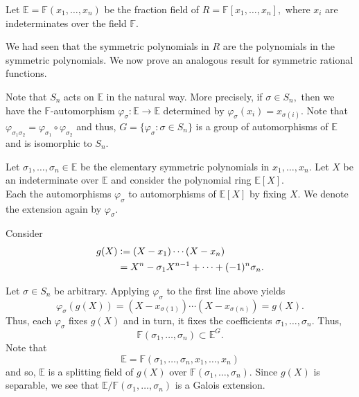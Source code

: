 \begin{ex}
    Let $\mathbb{E} = \mathbb{F}(x_1, \ldots, x_n)$ be the fraction field of $R = \mathbb{F}[x_1, \ldots, x_n],$ where $x_i$ are indeterminates over the field $\mathbb{F}.$

    We had seen that the symmetric polynomials in $R$ are the polynomials in the symmetric polynomials. We now prove an analogous result for symmetric rational functions. 

    Note that $S_n$ acts on $\mathbb{E}$ in the natural way. More precisely, if $\sigma \in S_n,$ then we have the $\mathbb{F}$-automorphism $\varphi_\sigma : \mathbb{E} \to \mathbb{E}$ determined by $\varphi_\sigma(x_i) = x_{\sigma(i)}.$ Note that $\varphi_{\sigma_1\sigma_2} = \varphi_{\sigma_1} \circ \varphi_{\sigma_2}$ and thus, $G = \{\varphi_\sigma : \sigma \in S_n\}$ is a group of automorphisms of $\mathbb{E}$ and is isomorphic to $S_n.$

    Let $\sigma_1, \ldots, \sigma_n \in \mathbb{E}$ be the elementary symmetric polynomials in $x_1, \ldots, x_n.$ Let $X$ be an indeterminate over $\mathbb{E}$ and consider the polynomial ring $\mathbb{E}[X].$ \\
    Each the automorphisms $\varphi_\sigma$ to automorphisms of $\mathbb{E}[X]$ by fixing $X.$ We denote the extension again by $\varphi_\sigma.$

    Consider
    \begin{align*} 
        g(X) &\vcentcolon= (X - x_1) \cdots (X - x_n)\\
        &= X^n - \sigma_1 X^{n - 1} + \cdots + (-1)^n\sigma_n.
    \end{align*}

    Let $\sigma \in S_n$ be arbitrary. Applying $\varphi_\sigma$ to the first line above yields
    \begin{equation*} 
        \varphi_\sigma(g(X)) = (X - x_{\sigma(1)}) \cdots (X - x_{\sigma(n)}) = g(X).
    \end{equation*}
    Thus, each $\varphi_\sigma$ fixes $g(X)$ and in turn, it fixes the coefficients $\sigma_1, \ldots, \sigma_n.$ Thus,
    \begin{equation*} 
        \mathbb{F}(\sigma_1, \ldots, \sigma_n) \subset \mathbb{E}^G.
    \end{equation*}
    Note that
    \begin{equation*} 
        \mathbb{E} = \mathbb{F}(\sigma_1, \ldots, \sigma_n, x_1, \ldots, x_n)
    \end{equation*}
    and so, $\mathbb{E}$ is a splitting field of $g(X)$ over $\mathbb{F}(\sigma_1, \ldots, \sigma_n).$ Since $g(X)$ is separable, we see that $\mathbb{E}/\mathbb{F}(\sigma_1, \ldots, \sigma_n)$ is a Galois extension. 


\end{ex}
